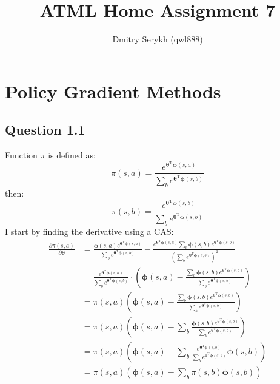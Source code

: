 \documentclass[a4paper]{article}
\title{\vspace{-5cm}ATML Home Assignment 7}
\author{Dmitry Serykh (qwl888)}
\newcommand*{\bs}[1]{\boldsymbol{#1}}
\begin{document}
\maketitle
\section{Policy Gradient Methods}
\label{sec:1}
\subsection*{Question 1.1}
\label{subsec:11}
Function $\pi$ is defined as:
\[
\pi(s, a)=\frac{e^{\boldsymbol{\theta}^{\mathrm{T}} \boldsymbol{\phi}(s, a)}}
   {\sum_{b} e^{\boldsymbol{\theta}^{\mathrm{T}} \boldsymbol{\phi}(s, b)}}
\]
then:
\[
\pi(s, b)=\frac{e^{\boldsymbol{\theta}^{\mathrm{T}} \boldsymbol{\phi}(s, b)}}
   {\sum_{b} e^{\boldsymbol{\theta}^{\mathrm{T}} \boldsymbol{\phi}(s, b)}}
\]
I start by finding the derivative using a CAS:
\begin{align*}
  \frac{\partial \pi(s, a)}{\partial \bs{\theta}} &=
  \frac{\bs{\phi}(s,a) e^{\boldsymbol{\theta}^{\mathrm{T}} \boldsymbol{\phi}(s, a)}}
       {\sum_{b} e^{\boldsymbol{\theta}^{\mathrm{T}} \boldsymbol{\phi}(s, b)}}
  -
  \frac{e^{\boldsymbol{\theta}^{\mathrm{T}} \boldsymbol{\phi}(s, a)}
        \sum_{b} \boldsymbol{\phi}(s, b)e^{\boldsymbol{\theta}^{\mathrm{T}} \boldsymbol{\phi}(s, b)}}
       {(\sum_{b} e^{\boldsymbol{\theta}^{\mathrm{T}} \boldsymbol{\phi}(s, b)})^2}\\
       &=\frac{e^{\boldsymbol{\theta}^{\mathrm{T}} \boldsymbol{\phi}(s, a)}}
              {\sum_{b} e^{\boldsymbol{\theta}^{\mathrm{T}} \boldsymbol{\phi}(s, b)}}
         \cdot
         \left(
         \boldsymbol{\phi}(s, a)-
         \frac{\sum_{b} \boldsymbol{\phi}(s, b)e^{\boldsymbol{\theta}^{\mathrm{T}} \boldsymbol{\phi}(s, b)}}
              {\sum_{b} e^{\boldsymbol{\theta}^{\mathrm{T}} \boldsymbol{\phi}(s, b)}}
              \right)\\
  &=
   \pi(s, a)\left(
  \boldsymbol{\phi}(s, a)-
  \frac{\sum_{b} \boldsymbol{\phi}(s, b)e^{\boldsymbol{\theta}^{\mathrm{T}} \boldsymbol{\phi}(s, b)}}
       {\sum_{b} e^{\boldsymbol{\theta}^{\mathrm{T}} \boldsymbol{\phi}(s, b)}}
       \right)\\
  &=
   \pi(s, a)\left(
  \boldsymbol{\phi}(s, a)-
  \sum_{b} \frac{\boldsymbol{\phi}(s, b)e^{\boldsymbol{\theta}^{\mathrm{T}} \boldsymbol{\phi}(s, b)}}
       {\sum_{b} e^{\boldsymbol{\theta}^{\mathrm{T}} \boldsymbol{\phi}(s, b)}}
       \right)\\
  &=
  \pi(s, a)\left(
  \boldsymbol{\phi}(s, a)-
  \sum_{b} \frac{e^{\boldsymbol{\theta}^{\mathrm{T}} \boldsymbol{\phi}(s, b)}}
      {\sum_{b} e^{\boldsymbol{\theta}^{\mathrm{T}} \boldsymbol{\phi}(s, b)}
      }\boldsymbol{\phi}(s, b)
  \right)\\
  &=
  \pi(s, a)\left(
  \boldsymbol{\phi}(s, a)-
  \sum_{b}
  \pi(s, b)
  \boldsymbol{\phi}(s, b)
  \right)
\end{align*}
\end{document}
